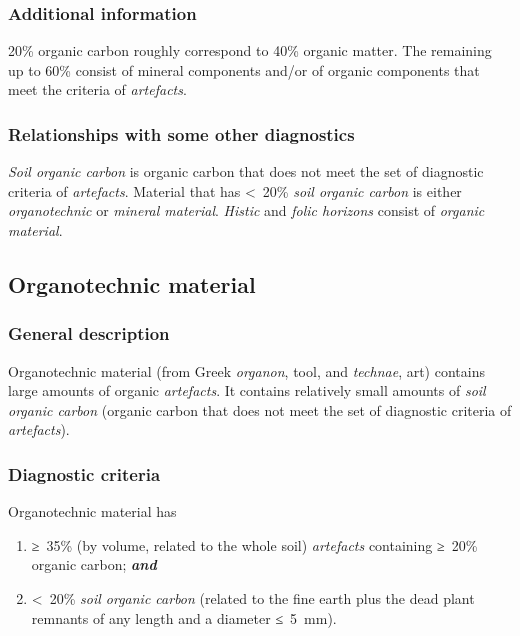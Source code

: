 \documentclass[
  letterpaper,
  DIV=11,
  numbers=noendperiod]{scrreprt}
\providecommand{\tightlist}{%
  \setlength{\itemsep}{0pt}\setlength{\parskip}{0pt}}\usepackage{longtable,booktabs,array}
\begin{document}
\hypertarget{additional-information-31}{%
\subsubsection{Additional information}\label{additional-information-31}}

20\% organic carbon roughly correspond to 40\% organic matter. The
remaining up to 60\% consist of mineral components and/or of organic
components that meet the criteria of \emph{artefacts}.

\hypertarget{relationships-with-some-other-diagnostics-60}{%
\subsubsection{Relationships with some other
diagnostics}\label{relationships-with-some-other-diagnostics-60}}

\emph{Soil organic carbon} is organic carbon that does not meet the set
of diagnostic criteria of \emph{artefacts}. Material that has
\textless~20\% \emph{soil organic carbon} is either \emph{organotechnic}
or \emph{mineral material}. \emph{Histic} and \emph{folic horizons}
consist of \emph{organic material}.

\hypertarget{organotechnic-material}{%
\subsection{Organotechnic material}\label{organotechnic-material}}

\hypertarget{general-description-65}{%
\subsubsection{General description}\label{general-description-65}}

Organotechnic material (from Greek \emph{organon}, tool, and
\emph{technae}, art) contains large amounts of organic \emph{artefacts}.
It contains relatively small amounts of \emph{soil organic carbon}
(organic carbon that does not meet the set of diagnostic criteria of
\emph{artefacts}).

\hypertarget{diagnostic-criteria-70}{%
\subsubsection{Diagnostic criteria}\label{diagnostic-criteria-70}}

Organotechnic material has

\begin{enumerate}
\def\labelenumi{\arabic{enumi}.}
\tightlist
\item
  ≥~35\% (by volume, related to the whole soil) \emph{artefacts}
  containing ≥~20\% organic carbon; \textbf{\emph{and}}
\item
  \textless~20\% \emph{soil organic carbon} (related to the fine earth
  plus the dead plant remnants of any length and a diameter ≤~5~mm).
\end{enumerate}
\end{document}
